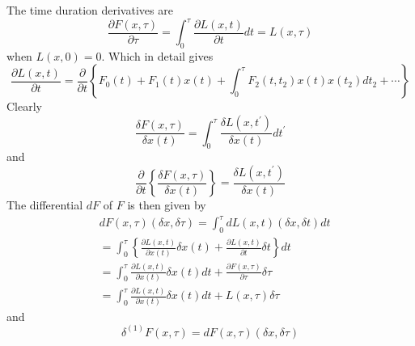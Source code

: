 \documentclass[aps,preprint]{revtex4}%
\begin{document}
The time duration derivatives are
\begin{equation}
\frac{\partial F\left(  x,\tau\right)  }{\partial\tau}=\int_{0}^{\tau}%
\frac{\partial L\left(  x,t\right)  }{\partial t}dt=L\left(  x,\tau\right)
\end{equation}
when $L\left(  x,0\right)  =0.$ Which in detail gives
\begin{equation}
\frac{\partial L\left(  x,t\right)  }{\partial t}=\frac{\partial}{\partial
t}\left\{  F_{0}\left(  t\right)  +F_{1}\left(  t\right)  x\left(  t\right)
+\int_{0}^{\tau}F_{2}\left(  t,t_{2}\right)  x\left(  t\right)  x\left(
t_{2}\right)  dt_{2}+\cdots\right\}
\end{equation}
Clearly
\begin{equation}
\frac{\delta F\left(  x,\tau\right)  }{\delta x\left(  t\right)  }=\int
_{0}^{\tau}\frac{\delta L\left(  x,t^{\prime}\right)  }{\delta x\left(
t\right)  }dt^{\prime}%
\end{equation}
and
\begin{equation}
\frac{\partial}{\partial t}\left\{  \frac{\delta F\left(  x,\tau\right)
}{\delta x\left(  t\right)  }\right\}  =\frac{\delta L\left(  x,t^{\prime
}\right)  }{\delta x\left(  t\right)  }%
\end{equation}
The differential $dF$ of $F$ is then given by
\begin{align}
&  dF\left(  x,\tau\right)  \left(  \delta x,\delta\tau\right)  =\int
_{0}^{\tau}dL\left(  x,t\right)  \left(  \delta x,\delta t\right)
dt\nonumber\\
&  =\int_{0}^{\tau}\left\{  \frac{\partial L\left(  x,t\right)  }{\partial
x\left(  t\right)  }\delta x\left(  t\right)  +\frac{\partial L\left(
x,t\right)  }{\partial t}\delta t\right\}  dt\nonumber\\
&  =\int_{0}^{\tau}\frac{\partial L\left(  x,t\right)  }{\partial x\left(
t\right)  }\delta x\left(  t\right)  dt+\frac{\partial F\left(  x,\tau\right)
}{\partial\tau}\delta\tau\nonumber\\
&  =\int_{0}^{\tau}\frac{\partial L\left(  x,t\right)  }{\partial x\left(
t\right)  }\delta x\left(  t\right)  dt+L\left(  x,\tau\right)  \delta\tau
\end{align}
and
\begin{equation}
\delta^{\left(  1\right)  }F\left(  x,\tau\right)  =dF\left(  x,\tau\right)
\left(  \delta x,\delta\tau\right)
\end{equation}
\end{document}
